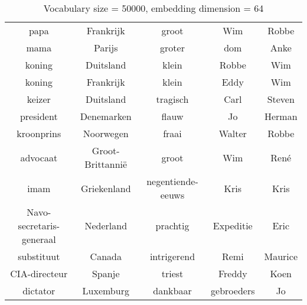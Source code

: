 \begin{table}[H]
\centering
\caption[Vocabulary size = 50000, embedding dimension = 64]{Vocabulary size = 50000, embedding dimension = 64}
\label{tab:emb_experiments_relations}
\begin{tabular}{|c|c|c|c|c|}
\hline
papa & Frankrijk & groot & Wim & Robbe \\
mama & Parijs & groter & dom & Anke \\
koning & Duitsland & klein & Robbe & Wim \\ \hline \hline
koning & Frankrijk & klein & Eddy & Wim\\
keizer & Duitsland & tragisch & Carl & Steven\\
president & Denemarken & flauw & Jo & Herman\\
kroonprins & Noorwegen & fraai & Walter & Robbe\\
advocaat & Groot-Brittannië & groot & Wim & René\\
imam & Griekenland & negentiende-eeuws & Kris & Kris\\
Navo-secretaris-generaal & Nederland & prachtig & Expeditie & Eric\\
substituut & Canada & intrigerend & Remi & Maurice\\
CIA-directeur & Spanje & triest & Freddy & Koen\\
dictator & Luxemburg & dankbaar & gebroeders & Jo\\
\hline
\end{tabular}
\end{table}
